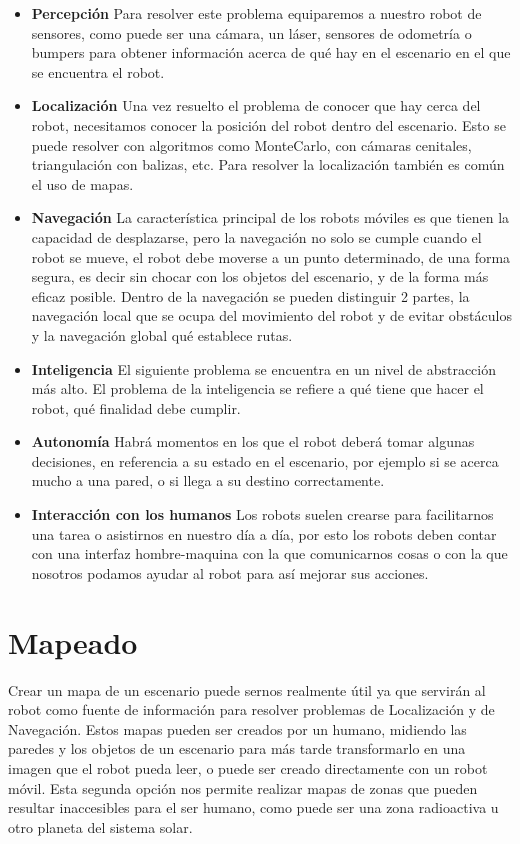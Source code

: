 \begin{itemize}
\item \textbf{Percepción} Para resolver este problema equiparemos a nuestro robot de sensores, como puede ser una cámara, un láser, sensores de odometría o bumpers para obtener información acerca de qué hay en el escenario en el que se encuentra el robot.
\item \textbf{Localización} Una vez resuelto el problema de conocer que hay cerca del robot, necesitamos conocer la posición del robot dentro del escenario. Esto se puede resolver con algoritmos como MonteCarlo, con cámaras cenitales, triangulación con balizas, etc. Para resolver la localización también es común el uso de mapas. 
\item \textbf{Navegación} La característica principal de los robots móviles es que tienen la capacidad de desplazarse, pero la navegación no solo se cumple cuando el robot se mueve, el robot debe moverse a un punto determinado, de una forma segura, es decir sin chocar con los objetos del escenario, y de la forma más eficaz posible. Dentro de la navegación se pueden distinguir 2 partes, la navegación local que se ocupa del movimiento del robot y de evitar obstáculos y la navegación global qué establece rutas.
\item \textbf{Inteligencia} El siguiente problema se encuentra en un nivel de abstracción más alto. El problema de la inteligencia se refiere a qué tiene que hacer el robot, qué finalidad debe cumplir.
\item \textbf{Autonomía} Habrá momentos en los que el robot deberá tomar algunas decisiones, en referencia a su estado en el escenario, por ejemplo si se acerca mucho a una pared, o si llega a su destino correctamente.
\item \textbf{Interacción con los humanos} Los robots suelen crearse para facilitarnos una tarea o asistirnos en nuestro día a día, por esto los robots deben contar con una interfaz hombre-maquina con la que comunicarnos cosas o con la que nosotros podamos ayudar al robot para así mejorar sus acciones.
\end{itemize}

\section{Mapeado}
\label{cap:mapeado}
Crear un mapa de un escenario puede sernos realmente útil ya que servirán al robot como fuente de información para resolver problemas de Localización y de Navegación. Estos mapas pueden ser creados por un humano, midiendo las paredes y los objetos de un escenario para más tarde transformarlo en una imagen que el robot pueda leer, o puede ser creado directamente con un robot móvil. Esta segunda opción nos permite realizar mapas de zonas que pueden resultar inaccesibles para el ser humano, como puede ser una zona radioactiva u otro planeta del sistema solar.

